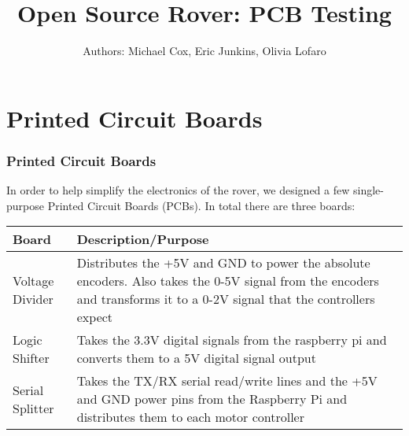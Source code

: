 \documentclass[12pt]{article}
\begin{document}
\title{Open Source Rover: PCB Testing}
\author{Authors: Michael Cox, Eric Junkins, Olivia Lofaro}

\makeatletter         
\def\@maketitle{
\begin{center}	
	\makebox[\textwidth][c]{ \texttt{[image: "Pictures/pcb title".png]}}
	{\Huge \bfseries \sffamily \@title }\\[3ex] 
	{\Large \sffamily \@author}\\[3ex] 
	\texttt{[image: "Pictures/Electronics/JPL logo".png]}
\end{center}}
\makeatother

\maketitle


\newpage


\tableofcontents

\newpage




\section{Printed Circuit Boards}

\subsubsection{Printed Circuit Boards}
In order to help simplify the electronics of the rover, we designed a few single-purpose Printed Circuit Boards (PCBs). In total there are three boards:
\bigskip

\begin{tabular}[2]{| p{5cm} | p{10cm} | }
	\hline
	\textbf{Board} & \textbf{Description/Purpose} \\ \hline
	Voltage Divider & Distributes the +5V and GND to power the absolute encoders. Also takes the 0-5V signal from the encoders and transforms it to a 0-2V signal that the controllers expect \\ \hline
	Logic Shifter & Takes the 3.3V digital signals from the raspberry pi and converts them to a 5V digital signal output \\ \hline
	Serial Splitter & Takes the TX/RX serial read/write lines and the +5V and GND power pins from the Raspberry Pi and distributes them to each motor controller \\ \hline
\end{tabular}
\bigskip
\end{document}
